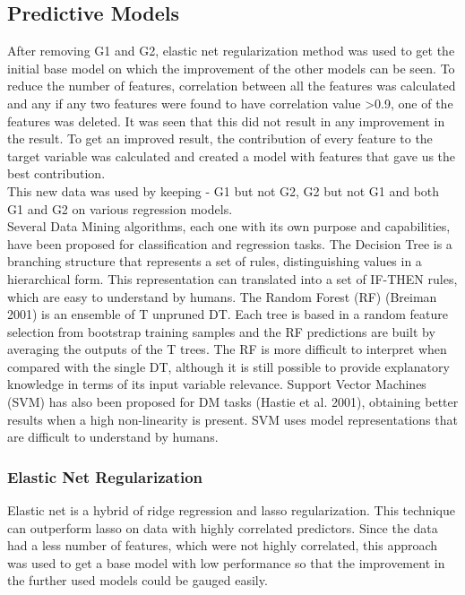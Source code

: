 \documentclass[conference]{IEEEtran}
\begin{document}
\subsection{Predictive Models}
After removing G1 and G2, elastic net regularization method was used to get the initial base model on which the improvement of the other models can be seen. To reduce the number of features, correlation between all the features was calculated and any if any two features were found to have correlation value \textgreater 0.9, one of the features was deleted.
It was seen that this did not result in any improvement in the result. To get an improved result, the contribution of every feature to the target variable was calculated and created a model with features that gave us the best contribution.\\
This new data was used by keeping - G1 but not G2, G2 but not G1 and both G1 and G2 on various regression models.\\
Several Data Mining algorithms, each one with its own purpose and capabilities, have been proposed for classification and regression tasks. The Decision Tree is a branching structure that represents a set of rules, distinguishing values in a hierarchical form. This representation can translated into a set of IF-THEN rules, which are easy to understand by humans. The Random Forest (RF) \cite{breiman2001random}(Breiman 2001) is an ensemble of T unpruned DT. Each tree is based in a random feature selection from bootstrap training samples and the RF predictions are built by averaging the outputs of the T trees. The RF is more difficult to interpret when compared with the single DT, although it is still possible to provide explanatory knowledge in terms of its input variable relevance. Support Vector Machines (SVM) has also been proposed for DM tasks\cite{trevor2009elements} (Hastie et al. 2001), obtaining better results when a high non-linearity is present. SVM uses model representations that are difficult to understand by humans.\\
\subsubsection{Elastic Net Regularization}

Elastic net is a hybrid of ridge regression and lasso regularization. This technique can outperform lasso on data with highly correlated predictors. Since the data had a less number of features, which were not highly correlated, this approach was used to get a base model with low performance so that the improvement in the further used models could be gauged easily.\\
\end{document}
